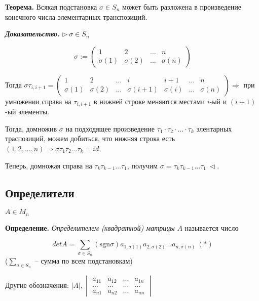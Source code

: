 \bigskip
\textbf{Теорема.} Всякая подстановка $\sigma \in S_n$ может быть разложена в произведение конечного числа элементарных транспозиций.

\bigskip
\textbf{\textit{Доказательство.}} $\rhd \ \sigma \in S_n$

\begin{equation*}\sigma := 
\begin{pmatrix} 
	1 & 2 & \dots & n \\ 
	\sigma (1) & \sigma (2) & \dots & \sigma (n)
\end{pmatrix}\end{equation*}

Тогда $\sigma \tau_{i, i+1} = \begin{pmatrix} 
	1 & 2 & \dots & i & i+1 & \dots & n \\ 
	\sigma (1) & \sigma (2) & \dots & \sigma(i+1) & \sigma(i) & \dots & \sigma (n)
\end{pmatrix} \Rightarrow$ при умножении справа на $\tau_{i, i+1}$ в нижней строке меняются местами $i$-ый и $(i+1)$-ый элементы.

Тогда, домножив $\sigma$ на подходящее произведение $\tau_1 \cdot \tau_2 \cdot \dots \cdot \tau_k$ элентарных траспозиций, можем добиться, что нижняя строка есть $(1, 2, \dots, n) \Rightarrow \sigma \tau_1 \tau_2 \dots \tau_k = id$.

Теперь, домножая справа на $\tau_k \tau_{k-1} \dots \tau_1$, получим $\sigma = \tau_k \tau_{k-1} \dots \tau_1 \ \lhd$.

\subsection{Определители}

$A \in M_n$

\bigskip
\textbf{Определение.} \textit{Определителем (квадратной) матрицы} $A$ называется число 

\begin{equation*} detA = \sum\limits_{\sigma \in S_n} (\mathrm{sgn} \sigma) a_{1, \sigma(1)} a_{2, \sigma(2)} \dots a_{n, \sigma(n)} \ (*)\end{equation*}
($\sum\limits_{\sigma \in S_n}$ -- сумма по всем подстановкам)

\bigskip
Другие обозначения: $|A|, \begin{vmatrix} a_{11} & a_{12} & \dots & a_{1n} \\ \dots & \dots & \dots & \dots \\ a_{n1} & a_{n2} & \dots & a_{nn} \end{vmatrix}$ 
 

